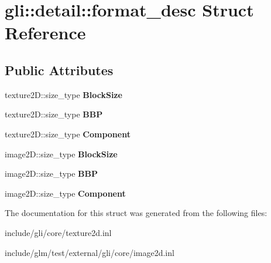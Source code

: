 \hypertarget{structgli_1_1detail_1_1format__desc}{\section{gli\-:\-:detail\-:\-:format\-\_\-desc \-Struct \-Reference}
\label{structgli_1_1detail_1_1format__desc}
}
\subsection*{\-Public \-Attributes}
\begin{DoxyCompactItemize}
\item 
\hypertarget{structgli_1_1detail_1_1format__desc_a2b9180ec3dc421d49520b6c5aabf8b9a}{texture2\-D\-::size\-\_\-type {\bfseries \-Block\-Size}}\label{structgli_1_1detail_1_1format__desc_a2b9180ec3dc421d49520b6c5aabf8b9a}

\item 
\hypertarget{structgli_1_1detail_1_1format__desc_a80b89ab226ec4dfc4f1af222044e44d9}{texture2\-D\-::size\-\_\-type {\bfseries \-B\-B\-P}}\label{structgli_1_1detail_1_1format__desc_a80b89ab226ec4dfc4f1af222044e44d9}

\item 
\hypertarget{structgli_1_1detail_1_1format__desc_af2d7be71cf4b35696f59d8c244420a04}{texture2\-D\-::size\-\_\-type {\bfseries \-Component}}\label{structgli_1_1detail_1_1format__desc_af2d7be71cf4b35696f59d8c244420a04}

\item 
\hypertarget{structgli_1_1detail_1_1format__desc_a8cd8ca00f9b7fd497287ee4da0b6c31d}{image2\-D\-::size\-\_\-type {\bfseries \-Block\-Size}}\label{structgli_1_1detail_1_1format__desc_a8cd8ca00f9b7fd497287ee4da0b6c31d}

\item 
\hypertarget{structgli_1_1detail_1_1format__desc_aec3a30d2176c0e2c7a1a4ae68f15bd82}{image2\-D\-::size\-\_\-type {\bfseries \-B\-B\-P}}\label{structgli_1_1detail_1_1format__desc_aec3a30d2176c0e2c7a1a4ae68f15bd82}

\item 
\hypertarget{structgli_1_1detail_1_1format__desc_a2a2d74e91578945a738b597349d2c5d7}{image2\-D\-::size\-\_\-type {\bfseries \-Component}}\label{structgli_1_1detail_1_1format__desc_a2a2d74e91578945a738b597349d2c5d7}

\end{DoxyCompactItemize}


\-The documentation for this struct was generated from the following files\-:\begin{DoxyCompactItemize}
\item 
include/gli/core/texture2d.\-inl\item 
include/glm/test/external/gli/core/image2d.\-inl\end{DoxyCompactItemize}
